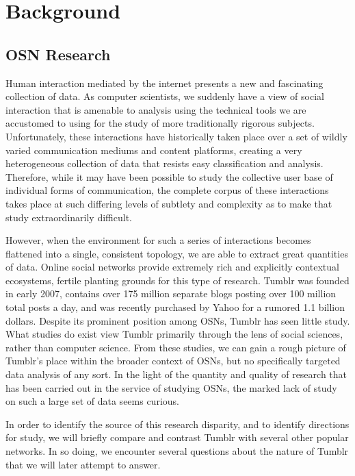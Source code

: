 \section{Background}
\label{sec:-back}
\subsection{OSN Research}


Human interaction mediated by the internet presents a new and fascinating 
collection of data\cite{werry1996internet}.  As computer scientists, 
we suddenly have a view of social interaction that is amenable to analysis 
using the technical tools we are accustomed to using for the study of 
more traditionally rigorous subjects.  Unfortunately, these interactions 
have historically taken place over a set of wildly varied communication 
mediums and content platforms, creating a very heterogeneous collection 
of data that resists easy classification and analysis.  Therefore, while 
it may have been possible to study the collective user base of individual 
forms of communication\cite{reid1991electropolis}, the complete corpus of 
these interactions takes place at such differing levels of subtlety and 
complexity as to make that study extraordinarily difficult.

However, when the environment for such a series of interactions becomes 
flattened into a single, consistent topology, we are able to extract 
great quantities of data.  Online social networks provide extremely 
rich and explicitly contextual ecosystems, fertile planting grounds for 
this type of research.  Tumblr was founded in early 2007, contains over 
175 million separate blogs posting over 100 million total posts a 
day\cite{tumblr:about}, and was recently purchased by Yahoo for a 
rumored 1.1 billion dollars\cite{bbc-business}.  Despite its prominent 
position among OSNs, Tumblr has seen little study.  What studies do 
exist view Tumblr primarily through the lens of social 
sciences\cite{thomas2012revisioning}, rather than computer science.  
From these studies, we can gain a rough picture of 
Tumblr's place within the broader context of OSNs, but no specifically 
targeted data analysis of any sort.  In the light of the quantity and 
quality of research that has been carried out in the service of studying 
OSNs, the marked lack of study on such a large set of data seems curious.


In order to identify the source of this research disparity, and to
identify directions for study, we will briefly compare and contrast 
Tumblr with several other popular networks.  In so doing, we encounter 
several questions about the nature of Tumblr that we will later 
attempt to answer.


